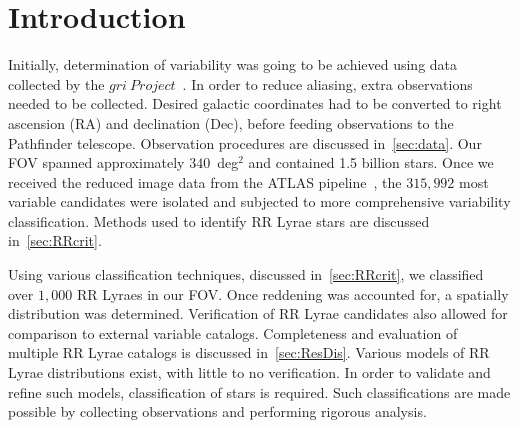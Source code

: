 \documentclass[aps,prb,twocolumn,superscriptaddress]{revtex4-1}
\begin{document}
\maketitle    




\section{Introduction}

Initially, determination of variability was going to be achieved using data collected by the $gri~Project$~\cite{gri}.  %
In order to reduce aliasing, extra observations needed to be collected.  Desired galactic coordinates had to 
be converted to right ascension (RA) and declination (Dec), before feeding observations to the Pathfinder telescope.
Observation procedures are discussed in~\cref{sec:data}.
Our FOV spanned approximately $340$~deg$^{2}$ and contained 1.5 billion stars.  Once we received the reduced 
image data from the ATLAS pipeline~\cite{gri}, the $315,992$ most variable candidates were isolated and subjected to 
more comprehensive variability classification.  Methods used to identify RR Lyrae stars are discussed in~\cref{sec:RRcrit}.

\indent Using various classification techniques, discussed in~\cref{sec:RRcrit}, we classified over $1,000$ RR Lyraes in our FOV.  Once reddening was accounted for, a spatially distribution was determined.  
Verification of RR Lyrae candidates also allowed for comparison to external 
variable catalogs.  Completeness and evaluation of multiple RR Lyrae catalogs 
is discussed in~\cref{sec:ResDis}.  Various models of RR Lyrae distributions 
exist, with little to no verification.  In order to validate and refine such 
models, classification of stars is required.   Such classifications are made 
possible by collecting observations and performing rigorous analysis.
  
\end{document}
